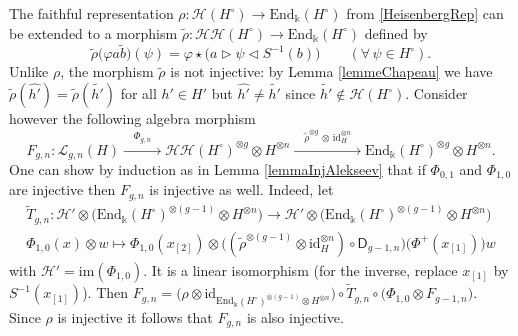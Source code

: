 \documentclass[11pt]{amsart}
\begin{document}
\indent The faithful representation $\rho : \mathcal{H}(H^\circ) \to \mathrm{End}_\Bbbk(H^\circ)$ from \eqref{HeisenbergRep} can be extended to a morphism $\widetilde{\rho} : \mathcal{HH}(H^\circ) \to \mathrm{End}_\Bbbk(H^\circ)$ defined by
\begin{equation}\label{HeisenbergRepHH}
\widetilde{\rho}\bigl( \varphi a  \widetilde{b} \bigr)(\psi) = \varphi \star \bigl( a \rhd \psi \lhd S^{-1}(b) \bigr) \qquad (\forall \, \psi \in H^\circ).
\end{equation}
Unlike $\rho$, the morphism $\widetilde{\rho}$ is not injective: by Lemma \ref{lemmeChapeau} we have $\widetilde{\rho}(\widehat{h'}) = \widetilde{\rho}(\widetilde{h'})$ for all $h' \in H'$ but $\widehat{h'} \neq \widetilde{h'}$ since $\widetilde{h'} \not\in \mathcal{H}(H^\circ)$. Consider however the following algebra morphism
\begin{equation}\label{defFgn}
F_{g,n} : \mathcal{L}_{g,n}(H) \xrightarrow{\quad\Phi_{g,n}\quad} \mathcal{HH}(H^\circ)^{\otimes g} \otimes H^{\otimes n} \xrightarrow{\quad\widetilde{\rho}^{\otimes g} \,\otimes\, \mathrm{id}_H^{\otimes n}\quad} \mathrm{End}_\Bbbk(H^\circ)^{\otimes g} \otimes H^{\otimes n}.
\end{equation}
One can show by induction as in Lemma \ref{lemmaInjAlekseev} that if $\Phi_{0,1}$ and $\Phi_{1,0}$ are injective then $F_{g,n}$ is injective as well. Indeed, let
\[ \begin{array}{c}
 \widetilde{T}_{g,n} : \mathcal{H}' \otimes \bigl( \mathrm{End}_\Bbbk(H^\circ)^{\otimes (g-1)} \otimes H^{\otimes n} \bigr) \to \mathcal{H}' \otimes \bigl( \mathrm{End}_\Bbbk(H^\circ)^{\otimes (g-1)} \otimes H^{\otimes n} \bigr)\\[.3em]
\Phi_{1,0}(x) \otimes w \mapsto \Phi_{1,0}(x_{[2]}) \otimes \bigl( (\widetilde{\rho}^{\otimes (g-1)} \otimes \mathrm{id}_H^{\otimes n}) \circ \mathsf{D}_{g-1,n}\bigr)\bigl( \Phi^+(x_{[1]}) \bigr)w
\end{array}\]
with $\mathcal{H}' = \mathrm{im}(\Phi_{1,0})$. It is a linear  isomorphism (for the inverse, replace $x_{[1]}$ by $S^{-1}(x_{[1]})$). Then $F_{g,n} = \bigl( \rho \otimes \mathrm{id}_{\mathrm{End}_\Bbbk(H^\circ)^{\otimes (g-1)} \otimes H^{\otimes n}} \bigr) \circ \widetilde{T}_{g,n} \circ \bigl( \Phi_{1,0} \otimes F_{g-1,n} \bigr)$. Since $\rho$ is injective it follows that $F_{g,n}$ is also injective.
\end{document}
